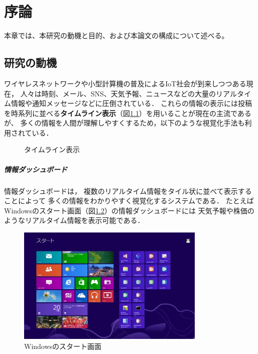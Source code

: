 \chapter{序論}
\label{chap:introduction}

本章では、本研究の動機と目的、および本論文の構成について述べる。

\newpage

\section{研究の動機}

ワイヤレスネットワークや小型計算機の普及によるIoT社会が到来しつつある現在，
人々は時刻、メール、SNS、天気予報、ニュースなどの大量のリアルタイム情報や通知メッセージなどに圧倒されている．
これらの情報の表示には投稿を時系列に並べる{\bf タイムライン表示}（図\ref{timeline}）を用いることが現在の主流であるが、
多くの情報を人間が理解しやすくするため，以下のような視覚化手法も利用されている．

\begin{figure}[H]
\centering
{}
\caption{タイムライン表示}
\label{timeline}
\end{figure}

\vspace{3mm}

\paragraph*{情報ダッシュボード}

情報ダッシュボード\cite{few}は，
複数のリアルタイム情報をタイル状に並べて表示することによって
多くの情報をわかりやすく視覚化するシステムである．
たとえばWindowsのスタート画面（図\ref{windows}）の情報ダッシュボードには
天気予報や株価のようなリアルタイム情報を表示可能である．

\begin{figure}[H]
\centering
\includegraphics[width=9cm]{images/windows.png}
\caption{Windowsのスタート画面}
\label{windows}
\end{figure}


